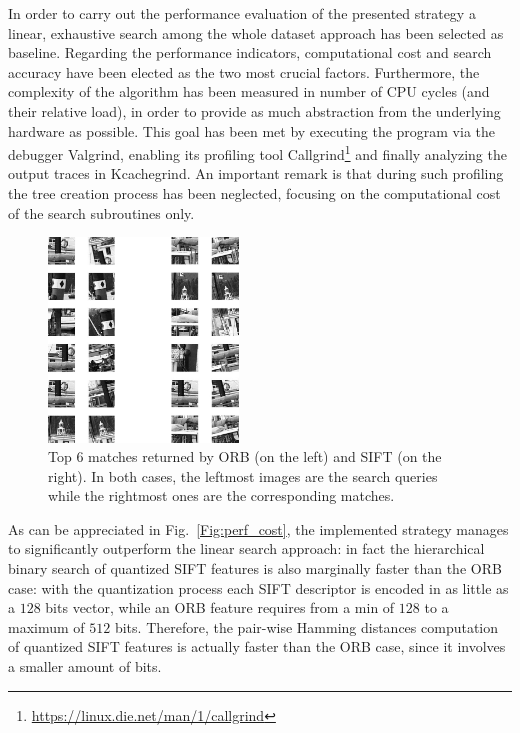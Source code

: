 \documentclass[a4paper, 11pt, oneside]{article}
\begin{document}
In order to carry out the performance evaluation of the presented strategy a linear, exhaustive search among the whole dataset approach has been selected as baseline. Regarding the performance indicators, computational cost and search accuracy have been elected as the two most crucial factors. Furthermore, the complexity of the algorithm has been measured in number of CPU cycles (and their relative load), in order to provide as much abstraction from the underlying hardware as possible. This goal has been met by executing the program via the debugger Valgrind, enabling its profiling tool Callgrind\footnote{\url{https://linux.die.net/man/1/callgrind}} and finally analyzing the output traces in Kcachegrind. An important remark is that during such profiling the tree creation process has been neglected, focusing on the computational cost of the search subroutines only.
\begin{figure}
\vspace{-20pt}
  \begin{center}
    \includegraphics[width=0.45\textwidth]{figures/merged.png}
  \end{center}
  \caption{Top $6$ matches returned by ORB (on the left) and SIFT (on the right). In both cases, the leftmost images are the search queries while the rightmost ones are the corresponding matches.}
  \label{Fig:perf_acc}
\end{figure}
As can be appreciated in Fig.~\ref{Fig:perf_cost}, the implemented strategy manages to significantly outperform the linear search approach: in fact the hierarchical binary search of quantized SIFT features is also marginally faster than the ORB case: with the quantization process each SIFT descriptor is encoded in as little as a $128$ bits vector, while an ORB feature requires from a min of $128$ to a maximum of $512$ bits. Therefore, the pair-wise Hamming distances computation of quantized SIFT features is actually faster than the ORB case, since it involves a smaller amount of bits. 
\end{document}
